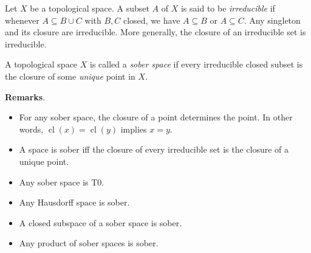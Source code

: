 \documentclass[12pt]{article}
\newcommand{\cl}[1]{\operatorname{cl}(#1)}
\begin{document}
Let $X$ be a topological space.  A subset $A$ of $X$ is said to be \emph{irreducible} if whenever $A\subseteq B\cup C$ with $B,C$ closed, we have $A\subseteq B$ or $A\subseteq C$.  Any singleton and its closure are irreducible.  More generally, the closure of an irreducible set is irreducible.

A topological space $X$ is called a \emph{sober space} if every irreducible closed subset is the closure of some \emph{unique} point in $X$.

\textbf{Remarks}.
\begin{itemize}
\item For any sober space, the closure of a point determines the point.  In other words, $\cl x=\cl y$ implies $x=y$.
\item A space is sober iff the closure of every irreducible set is the closure of a unique point.
\item Any sober space is T0.
\item Any Hausdorff space is sober.
\item A closed subspace of a sober space is sober.
\item Any product of sober spaces is sober.
\end{itemize}
\end{document}
